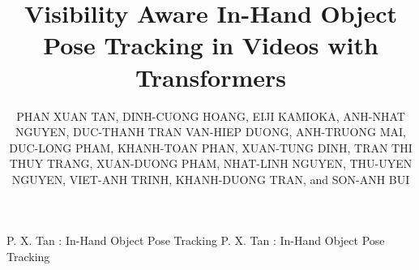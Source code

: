 \documentclass{ieeeaccess}
\begin{document}

\title{Visibility Aware In-Hand Object Pose Tracking in Videos with Transformers}

\author{\uppercase{Phan Xuan Tan},
\uppercase{Dinh-Cuong Hoang},
\uppercase{Eiji Kamioka},
\uppercase{Anh-Nhat Nguyen},
\uppercase{Duc-Thanh Tran}
\uppercase{Van-Hiep Duong},
\uppercase{Anh-Truong Mai},
\uppercase{Duc-Long Pham},
\uppercase{Khanh-Toan Phan},
\uppercase{Xuan-Tung Dinh},
\uppercase{Tran Thi Thuy Trang},
\uppercase{Xuan-Duong Pham},
\uppercase{Nhat-Linh Nguyen},
\uppercase{Thu-Uyen Nguyen},
\uppercase{Viet-Anh Trinh},
\uppercase{Khanh-Duong Tran}, and
\uppercase{Son-Anh Bui}}

\address[1]{College of Engineering, Shibaura Institute of Technology, Tokyo 135-8548, Japan}
\address[2]{Greenwich Vietnam, FPT University, Hanoi, 10000, Vietnam}
\address[3]{IT Department, FPT University, Hanoi, 10000, Vietnam}


\markboth
{P. X. Tan \headeretal: In-Hand Object Pose Tracking}
{P. X. Tan \headeretal: In-Hand Object Pose Tracking}

\end{document}
